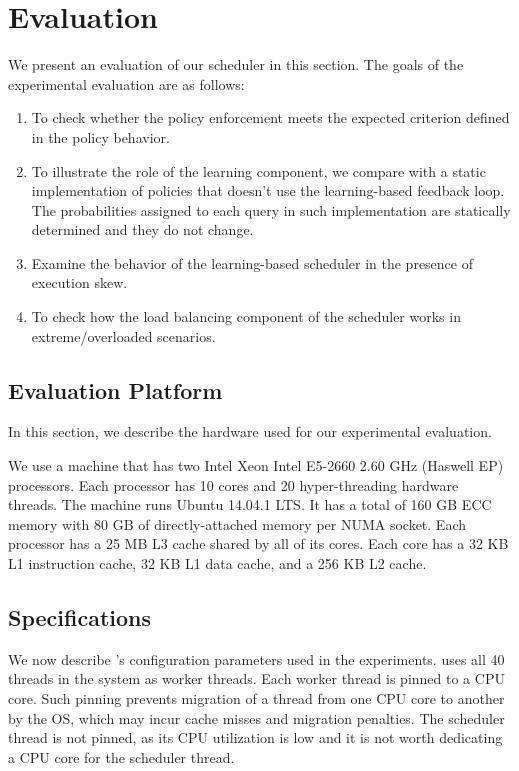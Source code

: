 \section{Evaluation}\label{sec:eval}
We present an evaluation of our scheduler in this section. 
The goals of the experimental evaluation are as follows:
\begin{enumerate}
\item To check whether the policy enforcement meets the expected criterion defined in 
the policy behavior. 
\item To illustrate the role of the learning component, we compare with a static implementation of policies that doesn't use the learning-based feedback loop. 
The probabilities assigned to each query in such implementation are statically determined and they do not change.
\item Examine the behavior of the learning-based scheduler in the presence of 
execution skew. 
\item To check how the load balancing component of the scheduler works in extreme/overloaded scenarios.
\end{enumerate}
\subsection{Evaluation Platform}
In this section, we describe the hardware used for our experimental evaluation. 

We use a machine %
that has two Intel Xeon Intel E5-2660 2.60 GHz (Haswell EP) processors. 
Each processor has 10 cores and 20 hyper-threading hardware threads. 
The machine runs Ubuntu 14.04.1 LTS. 
It has a total of 160 GB ECC memory with 80 GB of directly-attached memory per NUMA socket. 
Each processor has a 25 MB L3 cache shared by all of its cores. 
Each core has a 32 KB L1 instruction cache, 32 KB L1 data cache, and a 256 KB L2 cache.
\subsection{\sys{} Specifications}
We now describe \sys{}'s configuration parameters used in the experiments. 
\sys{} uses all 40 threads in the system as worker threads.
Each worker thread is pinned to a CPU core. 
Such pinning prevents migration of a thread from one CPU core to another by the OS, which may incur cache misses and migration penalties.
The scheduler thread is not pinned, as its CPU utilization is low and it is not worth dedicating a CPU core for the scheduler thread.

